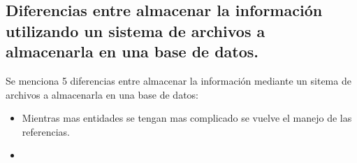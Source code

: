 \documentclass[10pt]{article}
\begin{document}
    \subsection{Diferencias entre almacenar la información utilizando un sistema de archivos  a almacenarla en una base de datos. }
    
    Se menciona 5 diferencias entre almacenar la información mediante un sitema de archivos a almacenarla en una base de datos:
    
    \begin{itemize}
    	\item Mientras mas entidades se tengan mas complicado se vuelve el manejo de las referencias.
    	\item
    \end{itemize}
    
\end{document}
